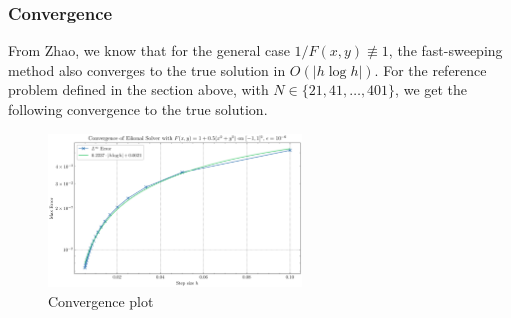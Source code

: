 \documentclass[11pt]{article}
\theoremstyle{definition}
\theoremstyle{remark}
\begin{document}
\subsubsection{Convergence}
From Zhao, we know that for the general case $1/F(x,y)\not\equiv1$, the fast-sweeping method also converges to the true solution in $O(|h\log h|)$. For the reference problem defined in the section above, with $N\in\{21,41,\dots,401\}$, we get the following convergence to the true solution.

\begin{figure}[h]
  \centering
  \includegraphics[width=0.6\textwidth]{plots/convergence2d_atan_step_size.png}
  \caption{Convergence plot}
  \label{fig:convarctan}
\end{figure}

\vspace{10pt}
\end{document}
